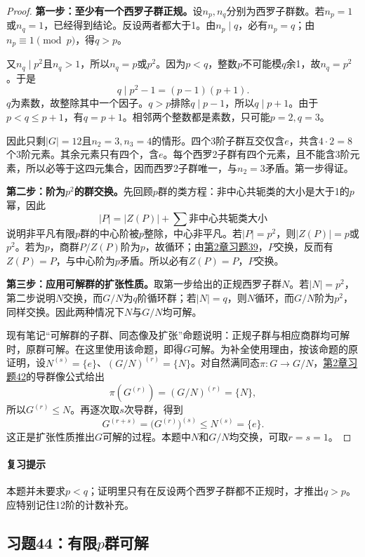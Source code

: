 \documentclass[UTF8,a4paper,11pt,fontset=windows]{ctexart}
\newcommand{\exref}[2]{\hyperref[ex:#1:#2]{第#1章习题#2}}
\begin{document}

\begin{proof}
\textbf{第一步：至少有一个西罗子群正规。}设$n_p,n_q$分别为西罗子群数。若$n_p=1$或$n_q=1$，已经得到结论。反设两者都大于1。由$n_p\mid q$，必有$n_p=q$；由$n_p\equiv1\pmod p$，得$q>p$。

又$n_q\mid p^2$且$n_q>1$，所以$n_q=p$或$p^2$。因为$p<q$，整数$p$不可能模$q$余1，故$n_q=p^2$。于是
\[
q\mid p^2-1=(p-1)(p+1).
\]
$q$为素数，故整除其中一个因子。$q>p$排除$q\mid p-1$，所以$q\mid p+1$。由于$p<q\le p+1$，有$q=p+1$。相邻两个整数都是素数，只可能$p=2,q=3$。

因此只剩$|G|=12$且$n_2=3,n_3=4$的情形。四个3阶子群互交仅含$e$，共含$4\cdot2=8$个3阶元素。其余元素只有四个，含$e$。每个西罗2子群有四个元素，且不能含3阶元素，所以必等于这四元集合，因而西罗2子群唯一，与$n_2=3$矛盾。第一步得证。

\textbf{第二步：阶为$p^2$的群交换。}先回顾$p$群的类方程：非中心共轭类的大小是大于1的$p$幂，因此
\[
|P|=|Z(P)|+\sum\text{非中心共轭类大小}
\]
说明非平凡有限$p$群的中心阶被$p$整除，中心非平凡。若$|P|=p^2$，则$|Z(P)|=p$或$p^2$。若为$p$，商群$P/Z(P)$阶为$p$，故循环；由\exref{2}{39}，$P$交换，反而有$Z(P)=P$，与中心阶为$p$矛盾。所以必有$Z(P)=P$，$P$交换。

\textbf{第三步：应用可解群的扩张性质。}取第一步给出的正规西罗子群$N$。若$|N|=p^2$，第二步说明$N$交换，而$G/N$为$q$阶循环群；若$|N|=q$，则$N$循环，而$G/N$阶为$p^2$，同样交换。因此两种情况下$N$与$G/N$均可解。

现有笔记“可解群的子群、同态像及扩张”命题说明：正规子群与相应商群均可解时，原群可解。在这里使用该命题，即得$G$可解。为补全使用理由，按该命题的原证明，设$N^{(s)}=\{e\}$、$(G/N)^{(r)}=\{N\}$。对自然满同态$\pi:G\to G/N$，\exref{2}{42}的导群像公式给出
\[
\pi(G^{(r)})=(G/N)^{(r)}=\{N\},
\]
所以$G^{(r)}\le N$。再逐次取$s$次导群，得到
\[
G^{(r+s)}=\bigl(G^{(r)}\bigr)^{(s)}\le N^{(s)}=\{e\}.
\]
这正是扩张性质推出$G$可解的过程。本题中$N$和$G/N$均交换，可取$r=s=1$。
\end{proof}

\paragraph{复习提示}
本题并未要求$p<q$；证明里只有在反设两个西罗子群都不正规时，才推出$q>p$。应特别记住12阶的计数补充。


\subsection{习题44：\texorpdfstring{有限$p$群可解}{有限p群可解}}
\label{ex:2:44}
\end{document}
